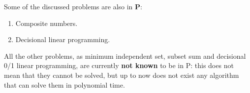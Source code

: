 Some of the discussed problems are also in \textbf{P}:
\begin{enumerate}
    \item Composite numbers.
    \item Decisional linear programming.
\end{enumerate}
All the other problems, as minimum independent set, subset sum and decisional 0/1 linear programming, are currently \textbf{not known} to be in P: this does 
not mean that they cannot be solved, but up to now does not exist any algorithm that can solve them in polynomial time. \vspace{7pt}